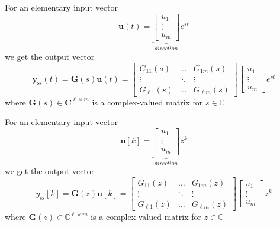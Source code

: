 For an elementary input vector
\begin{equation*}
    \mathbf{u}(t)=\underbrace{\begin{bmatrix}u_{1}  \\
            \vdots \\
            u_{m}
        \end{bmatrix}}_{direction} e^{st}
\end{equation*}
we get the output vector
\begin{equation*}
    \mathbf{y}_{{\mathrm{ss}}}(t)=\mathbf{G}(s)\mathbf{u}(t)=
    \begin{bmatrix}G_{11}(s)    & \ldots & G_{1m}(s)     \\
               \vdots       & \ddots & \vdots        \\
               G_{\ell1}(s) & \ldots & G_{\ell m}(s)
    \end{bmatrix}
    \begin{bmatrix}u_{1}  \\
        \vdots \\
        u_{m}
    \end{bmatrix}e^{st}
\end{equation*}
where $\mathbf{G}(s)\in\mathbb{\mathbf{C}}^{\ell\times m}$ is a complex-valued matrix for $s\in \mathbb{C}$


For an elementary input vector
\begin{equation*}
    \mathbf{u}[k]=\underbrace{\begin{bmatrix}u_{1}  \\
            \vdots \\
            u_{m}
        \end{bmatrix}}_{direction} z^k
\end{equation*}
we get the output vector
\begin{equation*}
    y_{{\mathrm{ss}}}[k]=\mathbf{G}(z)\mathbf{u}[k]=
    \begin{bmatrix}G_{11}(z)    & \ldots & G_{1m}(z)     \\
               \vdots       & \ddots & \vdots        \\
               G_{\ell1}(z) & \ldots & G_{\ell m}(z)
    \end{bmatrix}
    \begin{bmatrix}u_{1}  \\
        \vdots \\
        u_{m}
    \end{bmatrix}z^k
\end{equation*}
where $\mathbf{G}(z)\in\mathbb{C}^{\ell\times m}$ is a complex-valued matrix for $z\in \mathbb{C}$

